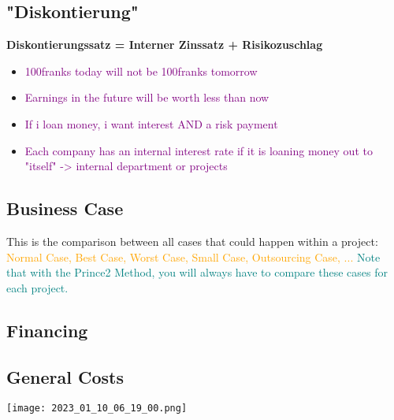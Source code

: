 \documentclass[main.tex,fontsize=12pt,paper=a4,paper=landscape,DIV=calc,]{scrartcl}
\begin{document}
\begin{multicols*}{2}
\subsection{"Diskontierung"}
\textbf{Diskontierungssatz = Interner Zinssatz + Risikozuschlag}\newline
\begin{itemize}
\item \textcolor{purple}{100franks today will not be 100franks tomorrow}
\item \textcolor{purple}{Earnings in the future will be worth less than now}
\item \textcolor{purple}{If i loan money, i want interest AND a risk payment}
\item \textcolor{purple}{Each company has an internal interest rate if it is loaning money out to "itself" -> internal department or projects}
\end{itemize} 

\subsection{Business Case}
This is the comparison between all cases that could happen within a project:\newline
\textcolor{orange}{Normal Case, Best Case, Worst Case, Small Case, Outsourcing Case, ...}\newline
\textcolor{teal}{Note that with the Prince2 Method, you will always have to compare these cases for each project.} 

\subsection{Financing}

\subsection{General Costs}
\texttt{[image: 2023\_01\_10\_06\_19\_00.png]}


\end{multicols*}
\end{document}
